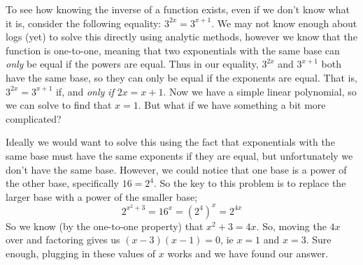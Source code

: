 \documentclass{ximera}
\begin{document}
    
    To see how knowing the inverse of a function exists, even if we don't know what it is, consider the following equality: $3^{2x} = 3^{x+1}$. We may not know enough about logs (yet) to solve this directly using analytic methods, however we know that the function is one-to-one, meaning that two exponentials with the same base can \textit{only} be equal if the powers are equal. Thus in our equality, $3^{2x}$ and $3^{x+1}$ both have the same base, so they can only be equal if the exponents are equal. That is, $3^{2x} = 3^{x+1}$ if, and \textit{only if} $2x = x+1$. Now we have a simple linear polynomial, so we can solve to find that $x = 1$. But what if we have something a bit more complicated?
    
    \begin{explanation}[Determine all $x$ values that satisfy $2^{x^2 + 3} = 16^{x}$]%
        Ideally we would want to solve this using the fact that exponentials with the same base must have the same exponents if they are equal, but unfortunately we don't have the same base. However, we could notice that one base is a power of the other base, specifically $16 = 2^4$. So the key to this problem is to replace the larger base with a power of the smaller base;
        \[
            2^{x^2 + 3} = 16^x = \left(2^4\right)^x = 2^{4x}
        \]
        So we know (by the one-to-one property) that $x^2 + 3 = 4x$. So, moving the $4x$ over and factoring gives us $(x-3)(x-1) = 0$, ie $x = 1$ and $x = 3$. Sure enough, plugging in these values of $x$ works and we have found our answer.
    \end{explanation}%

\end{document}
